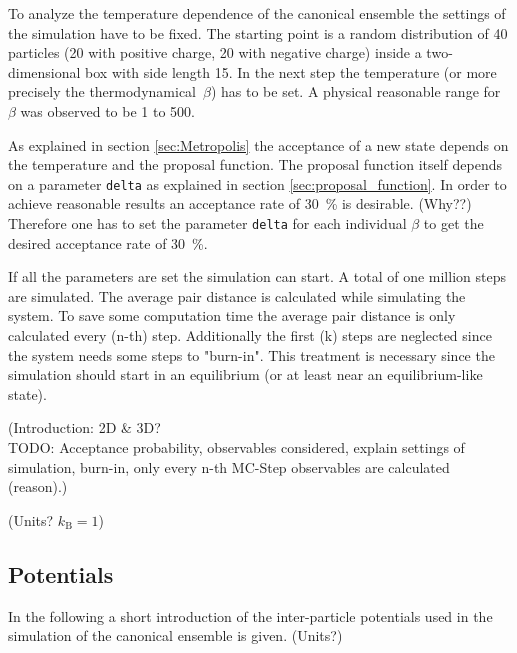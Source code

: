 \documentclass[11pt, a4paper]{article}
\numberwithin{equation}{section}
\newcommand{\remark}[1]{{\color{red}(#1)}}
\begin{document}
To analyze the temperature dependence of the canonical ensemble the settings of the simulation have to be fixed. 
The starting point is a random distribution of 40 particles (20 with positive charge, 20 with negative charge) inside a two-dimensional box with side length 15.
In the next step the temperature (or more precisely the thermodynamical~$\beta$) has to be set. 
A physical reasonable range for $\beta$ was observed to be 1 to 500. 

As explained in section \ref{sec:Metropolis} the acceptance of a new state depends on the temperature and the proposal function.
The proposal function itself depends on a parameter \texttt{delta} as explained in section \ref{sec:proposal_function}.
In order to achieve reasonable results an acceptance rate of \SI{30}{\percent} is desirable. \remark{Why??}
Therefore one has to set the parameter \texttt{delta} for each individual $\beta$ to get the desired acceptance rate of \SI{30}{\percent}.

If all the parameters are set the simulation can start.
A total of one million steps are simulated.
The average pair distance is calculated while simulating the system.
To save some computation time the average pair distance is only calculated every \remark{n-th} step.
Additionally the first \remark{k} steps are neglected since the system needs some steps to "burn-in".
This treatment is necessary since the simulation should start in an equilibrium (or at least near an equilibrium-like state).


\remark{Introduction: 2D \& 3D?\\
TODO: Acceptance probability, observables considered, explain settings of simulation, burn-in, only every n-th MC-Step observables are calculated (reason).}

\remark{Units? $k_\mathrm{B} = 1$}

\subsection{Potentials} \label{sec:Potentials}
In the following a short introduction of the inter-particle potentials used in the simulation of the canonical ensemble is given.
\remark{Units?}
\end{document}

